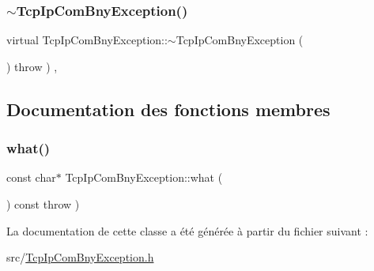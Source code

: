 \subsubsection{\texorpdfstring{$\sim$\+Tcp\+Ip\+Com\+Bny\+Exception()}{~TcpIpComBnyException()}}
{\footnotesize\ttfamily virtual Tcp\+Ip\+Com\+Bny\+Exception\+::$\sim$\+Tcp\+Ip\+Com\+Bny\+Exception (\begin{DoxyParamCaption}{ }\end{DoxyParamCaption}) throw  ) \hspace{0.3cm}{\ttfamily [inline]}, {\ttfamily [virtual]}}



\subsection{Documentation des fonctions membres}
\mbox{\label{classTcpIpComBnyException_a5a5d21a18a7863b106020a2c6113402d}} 
\subsubsection{\texorpdfstring{what()}{what()}}
{\footnotesize\ttfamily const char$\ast$ Tcp\+Ip\+Com\+Bny\+Exception\+::what (\begin{DoxyParamCaption}{ }\end{DoxyParamCaption}) const throw  ) \hspace{0.3cm}{\ttfamily [inline]}}



La documentation de cette classe a été générée à partir du fichier suivant \+:\begin{DoxyCompactItemize}
\item 
src/\hyperlink{TcpIpComBnyException_8h}{Tcp\+Ip\+Com\+Bny\+Exception.\+h}\end{DoxyCompactItemize}
